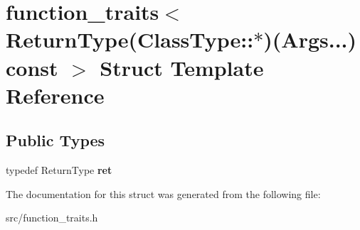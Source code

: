 \hypertarget{structfunction__traits_3_01_return_type_07_class_type_1_1_5_08_07_args_8_8_8_08_01const_01_01_4}{\section{function\-\_\-traits$<$ Return\-Type(Class\-Type\-:\-:$\ast$)(Args...) const $>$ Struct Template Reference}
\label{structfunction__traits_3_01_return_type_07_class_type_1_1_5_08_07_args_8_8_8_08_01const_01_01_4}
}
\subsection*{Public Types}
\begin{DoxyCompactItemize}
\item 
\hypertarget{structfunction__traits_3_01_return_type_07_class_type_1_1_5_08_07_args_8_8_8_08_01const_01_01_4_a64a9c06baa755e73f809837aaf9ede67}{typedef Return\-Type {\bfseries ret}}\label{structfunction__traits_3_01_return_type_07_class_type_1_1_5_08_07_args_8_8_8_08_01const_01_01_4_a64a9c06baa755e73f809837aaf9ede67}

\end{DoxyCompactItemize}


The documentation for this struct was generated from the following file\-:\begin{DoxyCompactItemize}
\item 
src/function\-\_\-traits.\-h\end{DoxyCompactItemize}
